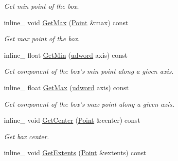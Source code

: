 \begin{DoxyCompactItemize}
\begin{DoxyCompactList}\small\item\em Get min point of the box. \end{DoxyCompactList}\item 
\hypertarget{class_a_a_b_b_ae332b8f1debc4985c7e2f0aac6ed761b}{inline\+\_\+ void \hyperlink{class_a_a_b_b_ae332b8f1debc4985c7e2f0aac6ed761b}{Get\+Max} (\hyperlink{class_point}{Point} \&max) const }\label{class_a_a_b_b_ae332b8f1debc4985c7e2f0aac6ed761b}

\begin{DoxyCompactList}\small\item\em Get max point of the box. \end{DoxyCompactList}\item 
\hypertarget{class_a_a_b_b_ae0adf093a00a40712aa1d07cade6e48b}{inline\+\_\+ float \hyperlink{class_a_a_b_b_ae0adf093a00a40712aa1d07cade6e48b}{Get\+Min} (\hyperlink{_ice_types_8h_a44c6f1920ba5551225fb534f9d1a1733}{udword} axis) const }\label{class_a_a_b_b_ae0adf093a00a40712aa1d07cade6e48b}

\begin{DoxyCompactList}\small\item\em Get component of the box's min point along a given axis. \end{DoxyCompactList}\item 
\hypertarget{class_a_a_b_b_a36fdeb0316837b4a39b1a98b02dbbdcb}{inline\+\_\+ float \hyperlink{class_a_a_b_b_a36fdeb0316837b4a39b1a98b02dbbdcb}{Get\+Max} (\hyperlink{_ice_types_8h_a44c6f1920ba5551225fb534f9d1a1733}{udword} axis) const }\label{class_a_a_b_b_a36fdeb0316837b4a39b1a98b02dbbdcb}

\begin{DoxyCompactList}\small\item\em Get component of the box's max point along a given axis. \end{DoxyCompactList}\item 
\hypertarget{class_a_a_b_b_a96ae6fa137afbc679cef52948a4d365a}{inline\+\_\+ void \hyperlink{class_a_a_b_b_a96ae6fa137afbc679cef52948a4d365a}{Get\+Center} (\hyperlink{class_point}{Point} \&center) const }\label{class_a_a_b_b_a96ae6fa137afbc679cef52948a4d365a}

\begin{DoxyCompactList}\small\item\em Get box center. \end{DoxyCompactList}\item 
\hypertarget{class_a_a_b_b_ae10e5bc6ce234bb65595196f0c7670cd}{inline\+\_\+ void \hyperlink{class_a_a_b_b_ae10e5bc6ce234bb65595196f0c7670cd}{Get\+Extents} (\hyperlink{class_point}{Point} \&extents) const }\label{class_a_a_b_b_ae10e5bc6ce234bb65595196f0c7670cd}


\end{DoxyCompactItemize}
